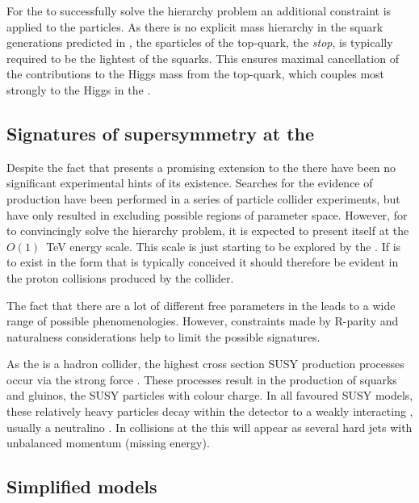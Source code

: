 For the \MSSM to successfully solve the hierarchy problem an
additional constraint is applied to the \SUSY particles. As there is
no explicit mass hierarchy in the squark generations predicted in
\SUSY, the sparticles of the top-quark, the \emph{stop}, is typically
required to be the lightest of the squarks. This ensures maximal
cancellation of the contributions to the Higgs mass from the
top-quark, which couples most strongly to the Higgs in the \SM.

\subsection{Signatures of supersymmetry at the \LHC}

Despite the fact that \SUSY presents a promising extension to the \SM
there have been no significant experimental hints of its existence.
Searches for the evidence of \SUSY production have been performed in a
series of particle collider experiments, but have only resulted in
excluding possible regions of \SUSY parameter space. However, for
\SUSY to convincingly solve the hierarchy problem, it is expected to
present itself at the $O(1)$~TeV energy scale. This scale is just
starting to be explored by the \LHC. If \SUSY is to exist in the form
that is typically conceived it should therefore be evident in the
proton collisions produced by the collider.

The fact that there are a lot of different free parameters in the
\MSSM leads to a wide range of possible \SUSY phenomenologies.
However, constraints made by R-parity and naturalness
considerations help to limit the possible signatures.


As the \LHC is a hadron collider, the highest cross section SUSY
production processes occur via the strong force
\cite{Martin:1997ns}
\cite{SUSYxsections_NewAspectsof_pp_collisions}. These processes
result in the production of squarks and gluinos, the SUSY particles
with colour charge. In all favoured SUSY models, these relatively
heavy particles decay within the detector to a weakly interacting \LSP,
usually a neutralino \cite{Farrar:1978xj}. In
collisions at the \LHC this will appear as several hard jets with
unbalanced momentum (missing energy). 

\subsection{Simplified models}

